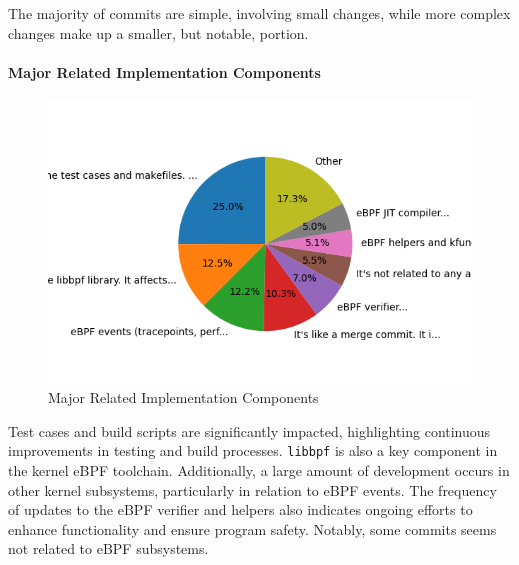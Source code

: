 The majority of commits are simple, involving small changes, while more complex changes make up a smaller, but notable, portion.
\paragraph{Major Related Implementation Components}
\begin{figure}[ht]
    \centering
    \includegraphics[width=\linewidth]{feature-analysis/commit_pie_chart_major_implementation_component.png}
    \caption{Major Related Implementation Components}\label{fig:commit_pie_chart_major_implementation_component}
\end{figure}

Test cases and build scripts are significantly impacted, highlighting continuous improvements in testing and build processes. \texttt{libbpf} is also a key component in the kernel eBPF toolchain. Additionally, a large amount of development occurs in other kernel subsystems, particularly in relation to eBPF events. The frequency of updates to the eBPF verifier and helpers also indicates ongoing efforts to enhance functionality and ensure program safety. Notably, some commits seems not related to eBPF subsystems.

